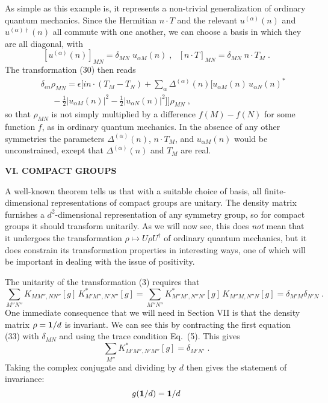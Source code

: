 \documentclass[12pt]{article}
\def\BM#1{\mbox{\boldmath{$#1$}}}
\begin{document}
As simple as this example is, it represents a non-trivial generalization of ordinary quantum mechanics.  Since the Hermitian $n\cdot T$ and the relevant $u^{(\alpha)}(n)$ and $u^{(\alpha)\dagger}(n)$ all commute with one another, we can choose a basis in which they are all diagonal, with
$$ [u^{(\alpha)}(n)]_{MN}=\delta_{MN}\;u_{\alpha M}(n)\;,~~~[n\cdot T]_{MN}=\delta_{MN}\;n\cdot T_{M}\;.$$
The transformation (30) then reads
\begin{eqnarray*}
&&\delta_{\epsilon n}\rho_{MN}=\epsilon\Bigg[in\cdot(T_{M}-T_{N})+\sum_\alpha \Delta^{(\alpha)}(n)\Big[u_{\alpha M}(n)\,u_{\alpha N}(n)^*
\\&&~~~~~~-\frac{1}{2}|u_{\alpha M}(n)|^2-\frac{1}{2}|u_{\alpha N}(n)|^2\Big]\Bigg]\rho_{MN}\;,
\end{eqnarray*}
so that $\rho_{MN}$ is not simply multiplied by a difference $f(M)-f(N)$ for some function $f$, as in ordinary quantum mechanics.  In the absence of any other symmetries the parameters $\Delta^{(\alpha)}(n)$, $n\cdot T_{M}$, and $u_{\alpha M}(n)$ would be  unconstrained, except that $\Delta^{(\alpha)}(n)$ and $T_{
M}$ are real.

\vspace{20pt}

\begin{center}
{\bf VI. COMPACT GROUPS}
\end{center}

A well-known theorem tells us that with a suitable choice of basis, all finite-dimensional representations of compact groups are unitary.  The density matrix furnishes a $d^2$-dimensional representation of any symmetry group, so  for compact groups it should transform unitarily.  As we will now see, this does {\em not} mean that  it undergoes the transformation $\rho\mapsto U\rho U^\dagger$ of ordinary quantum mechanics, but it does constrain its transformation properties in interesting ways, one of which will be important in dealing with the issue of positivity.

The unitarity of the transformation (3) requires that
\begin{equation}
\sum_{M''N''} K_{MM'',NN''}[g]\,K^*_{M'M'',N'N''}[g]=\sum_{M''N''} K^*_{M''M',N''N'}[g]\,K_{M''M,N''N}[g]=\delta_{M'M}\delta_{N'N}\;.
\end{equation}
One immediate consequence that we will need in Section VII is that the density matrix $\rho={\BM 1}/d$ is invariant.  We can see this by contracting the first equation (33) with $\delta_{MN}$ and using the trace condition Eq.~(5).  This gives
$$\sum_{M''}K^*_{M'M'',N'M''}[g]=\delta_{M'N'}\;.$$
Taking the complex conjugate and dividing by $d$ then gives the statement of invariance:
\begin{equation}
g({\BM 1}/d)={\BM 1}/d
\end{equation}
\end{document}

